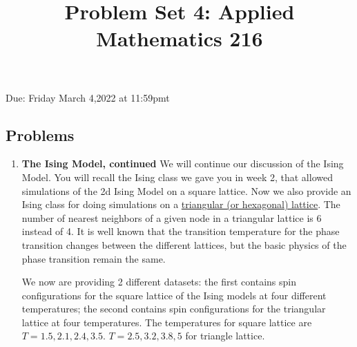 \documentclass[12pt]{amsart}
\title{Problem Set 4: Applied Mathematics 216}
\begin{document}
\maketitle

Due: Friday March 4,2022 at 11:59pmt\\


\subsection*{Problems}
\begin{enumerate}
\vskip 0.7cm
\item{\bf The Ising Model, continued} We will continue our discussion of the Ising Model. You will recall the Ising class we gave you in week 2, that allowed simulations of the 2d Ising Model on a square lattice. Now we also provide an Ising class for doing simulations on a \href{https://en.wikipedia.org/wiki/Hexagonal_lattice}{triangular (or hexagonal) lattice}.  The number of nearest neighbors of a given node in a triangular lattice is 6 instead of 4. It is well known that the transition temperature for the phase transition changes between the different lattices, but the basic physics of the phase transition remain the same.

We now are providing 2 different datasets:  the first contains spin configurations for the square lattice of the Ising models at four different temperatures; the second contains spin configurations for the triangular lattice at four temperatures. The temperatures for square lattice are $T = 1.5, 2.1, 2.4, 3.5$. $T = 2.5, 3.2, 3.8, 5$ for triangle lattice.


\end{enumerate}
\end{document}
